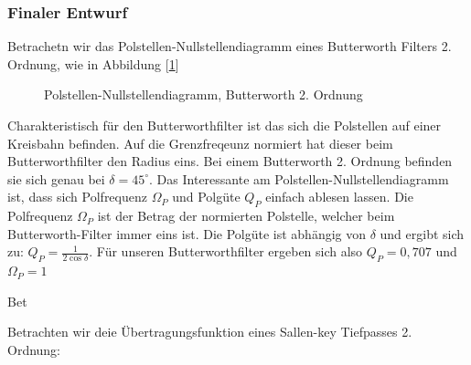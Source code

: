 \subsubsection{Finaler Entwurf}



Betrachetn wir das Polstellen-Nullstellendiagramm eines Butterworth Filters 2. Ordnung, wie in Abbildung [\ref{fig:filter_polnul}]


\begin{figure}[H]
\centering
{}
\caption{Polstellen-Nullstellendiagramm, Butterworth 2. Ordnung}
\label{fig:filter_polnul}
\end{figure}



Charakteristisch für den Butterworthfilter ist das sich die Polstellen auf einer Kreisbahn befinden. Auf die Grenzfreqeunz normiert hat dieser beim Butterworthfilter den Radius
eins. Bei einem Butterworth 2. Ordnung befinden sie sich genau bei $\delta=45^\circ$. Das Interessante am Polstellen-Nullstellendiagramm ist, dass sich Polfrequenz $\Omega_P$ und 
Polgüte $Q_P$ einfach ablesen lassen. Die Polfrequenz $\Omega_P$ ist der Betrag der normierten Polstelle, welcher beim Butterworth-Filter immer eins ist.
Die Polgüte ist abhängig von $\delta$ und ergibt sich zu: $Q_P=\frac{1}{2\cos{\delta}}$. Für unseren Butterworthfilter ergeben sich also $Q_P=0,707$ und $\Omega_P=1$



Bet

Betrachten wir deie Übertragungsfunktion eines Sallen-key Tiefpasses 2. Ordnung:

